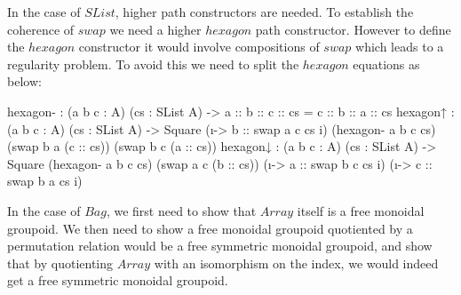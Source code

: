 \documentclass{article}
\newenvironment{code}{\verbatim}{\endverbatim}
\begin{document}
In the case of $SList$, higher path constructors are needed. To establish the coherence of $swap$ we need a higher $hexagon$
path constructor. However to define the $hexagon$ constructor it would involve compositions of $swap$ which leads to a regularity
problem. To avoid this we need to split the $hexagon$ equations as below:

\begin{code}
    hexagon- : (a b c : A) (cs : SList A)
    -> a :: b :: c :: cs = c :: b :: a :: cs
    hexagon↑ : (a b c : A) (cs : SList A)
    -> Square (\i -> b :: swap a c cs i) (hexagon- a b c cs)
    (swap b a (c :: cs)) (swap b c (a :: cs))
    hexagon↓ : (a b c : A) (cs : SList A)
    -> Square (hexagon- a b c cs) (swap a c (b :: cs))
    (\i -> a :: swap b c cs i) (\i -> c :: swap b a cs i)
\end{code}


In the case of $Bag$, we first need to show that $Array$ itself is a free monoidal groupoid. We then need to show a free
monoidal groupoid quotiented by a permutation relation would be a free symmetric monoidal groupoid, and show that by quotienting
$Array$ with an isomorphism on the index, we would indeed get a free symmetric monoidal groupoid.

\printbibliography
\end{document}
